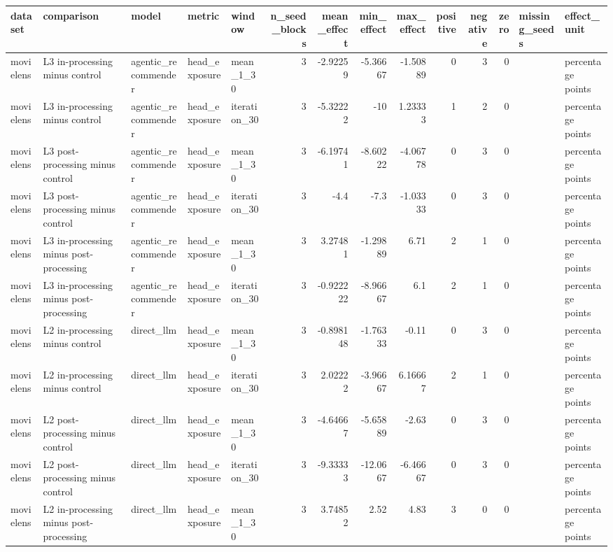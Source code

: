 \begin{table}[htbp!]
\centering
\small
\setlength{\tabcolsep}{3pt}
\renewcommand{\arraystretch}{1.1}
\begin{tabular}{lllllrrrrrrrll}
\hline
dataset & comparison & model & metric & window & n\_seed\_blocks & mean\_effect & min\_effect & max\_effect & positive & negative & zero & missing\_seeds & effect\_unit \\
\hline
movielens & L3 in-processing minus control & agentic\_recommender & head\_exposure & mean\_1\_30 & 3 & -2.92259 & -5.36667 & -1.50889 & 0 & 3 & 0 &  & percentage points \\
movielens & L3 in-processing minus control & agentic\_recommender & head\_exposure & iteration\_30 & 3 & -5.32222 & -10 & 1.23333 & 1 & 2 & 0 &  & percentage points \\
movielens & L3 post-processing minus control & agentic\_recommender & head\_exposure & mean\_1\_30 & 3 & -6.19741 & -8.60222 & -4.06778 & 0 & 3 & 0 &  & percentage points \\
movielens & L3 post-processing minus control & agentic\_recommender & head\_exposure & iteration\_30 & 3 & -4.4 & -7.3 & -1.03333 & 0 & 3 & 0 &  & percentage points \\
movielens & L3 in-processing minus post-processing & agentic\_recommender & head\_exposure & mean\_1\_30 & 3 & 3.27481 & -1.29889 & 6.71 & 2 & 1 & 0 &  & percentage points \\
movielens & L3 in-processing minus post-processing & agentic\_recommender & head\_exposure & iteration\_30 & 3 & -0.922222 & -8.96667 & 6.1 & 2 & 1 & 0 &  & percentage points \\
movielens & L2 in-processing minus control & direct\_llm & head\_exposure & mean\_1\_30 & 3 & -0.898148 & -1.76333 & -0.11 & 0 & 3 & 0 &  & percentage points \\
movielens & L2 in-processing minus control & direct\_llm & head\_exposure & iteration\_30 & 3 & 2.02222 & -3.96667 & 6.16667 & 2 & 1 & 0 &  & percentage points \\
movielens & L2 post-processing minus control & direct\_llm & head\_exposure & mean\_1\_30 & 3 & -4.64667 & -5.65889 & -2.63 & 0 & 3 & 0 &  & percentage points \\
movielens & L2 post-processing minus control & direct\_llm & head\_exposure & iteration\_30 & 3 & -9.33333 & -12.0667 & -6.46667 & 0 & 3 & 0 &  & percentage points \\
movielens & L2 in-processing minus post-processing & direct\_llm & head\_exposure & mean\_1\_30 & 3 & 3.74852 & 2.52 & 4.83 & 3 & 0 & 0 &  & percentage points \\

\end{tabular}
\end{table}
